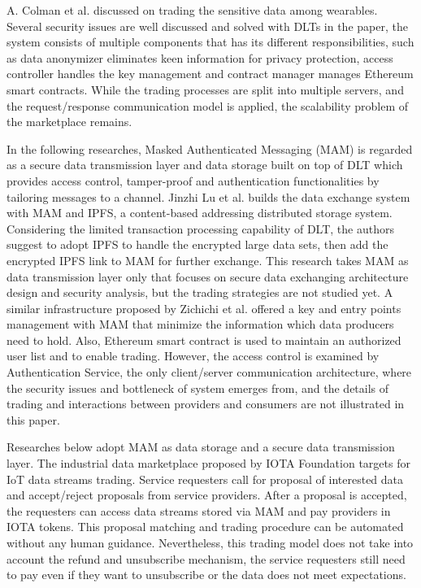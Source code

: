 \documentclass[conference]{IEEEtran}
\begin{document}
A. Colman et al. \cite{TrustedMarketplaceWearable} discussed on trading the sensitive data among wearables. Several security issues are well discussed and solved with DLTs in the paper, the system consists of multiple components that has its different responsibilities, such as data anonymizer eliminates keen information for privacy protection, access controller handles the key management and contract manager manages Ethereum smart contracts. While the trading processes are split into multiple servers, and the request/response communication model is applied, the scalability problem of the marketplace remains.

In the following researches, Masked Authenticated Messaging (MAM)\cite{MAM} is regarded as a secure data transmission layer and data storage built on top of DLT which provides access control, tamper-proof and authentication functionalities by tailoring messages to a channel. Jinzhi Lu et al.\cite{luDecentralizedDM} builds the data exchange system with MAM and IPFS\cite{IPFS}, a content-based addressing distributed storage system. Considering the limited transaction processing capability of DLT, the authors suggest to adopt IPFS to handle the encrypted large data sets, then add the encrypted IPFS link to MAM for further exchange. This research takes MAM as data transmission layer only that focuses on secure data exchanging architecture design and security analysis, but the trading strategies are not studied yet. A similar infrastructure proposed by Zichichi et al.\cite{SocialGood} offered a key and entry points management with MAM that minimize the information which data producers need to hold. Also, Ethereum smart contract is used to maintain an authorized user list and to enable trading. However, the access control is examined by Authentication Service, the only client/server communication architecture, where the security issues and bottleneck of system emerges from, and the details of trading and interactions between providers and consumers are not illustrated in this paper.

Researches below adopt MAM as data storage and a secure data transmission layer. The industrial data marketplace\cite{IOTAIdustryMarketplace} proposed by IOTA Foundation targets for IoT data streams trading. Service requesters call for proposal of interested data and accept/reject proposals from service providers. After a proposal is accepted, the requesters can access data streams stored via MAM and pay providers in IOTA tokens. This proposal matching and trading procedure can be automated without any human guidance\cite{IOTAIdustryMarketplaceWithoutHuman}. Nevertheless, this trading model does not take into account the refund and unsubscribe mechanism, the service requesters still need to pay even if they want to unsubscribe or the data does not meet expectations.
\end{document}
